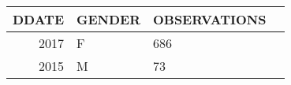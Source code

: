 \begin{table}[ht]
\centering
\begin{tabular}{rllr}
  \hline
DDATE & GENDER & OBSERVATIONS \\ 
  \hline
2017 & F & 686 \\ 
2015 & M &  73 \\ 
   \hline
\end{tabular}
\end{table}
